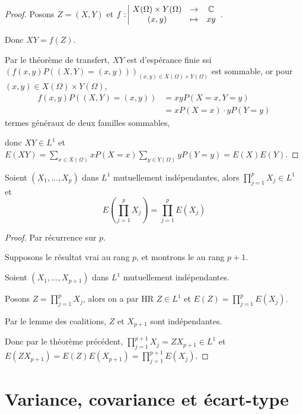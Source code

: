 \begin{proof}
    Posons $Z = (X, Y)$ et $f: \space \begin{array}{|ccc} \displaystyle X(\Omega) \times Y(\Omega) & \to & \displaystyle \mathbb{C} \\ \displaystyle (x, y) & \mapsto & \displaystyle xy \end{array}$.

    Donc $XY = f(Z)$.

    Par le théorème de transfert, $XY$ est d'espérance finie ssi $(f(x, y)P((X, Y) = (x, y)))_{(x, y) \in X(\Omega) \times Y(\Omega)}$ est sommable, 
    or pour $(x, y) \in X(\Omega) \times Y(\Omega)$, 
    \begin{align}
        f(x, y) P((X, Y) = (x, y)) & = x y P(X = x, Y = y) \\
        & = x P(X = x) \cdot y P(Y = y)
    \end{align}
    termes généraux de deux familles sommables, 
    
    donc $XY \in L^1$ et 
    $E(XY) = \displaystyle \sum_{x \in X(\Omega)} x P(X = x) \sum_{y \in Y(\Omega)} y P(Y = y) = E(X) E(Y)$.
\end{proof}

\begin{proposition}{}{}
    Soient $(X_1, \dots, X_p)$ dans $L^1$ mutuellement indépendantes, alors 
    $\displaystyle \prod_{j = 1}^p X_j \in L^1$ et 
    $$E\left( \prod_{j = 1}^{p } X_j \right) = \prod_{j = 1 }^{ p } E(X_j)$$
\end{proposition}


\begin{proof}
    Par récurrence sur $p$. 

    Supposons le résultat vrai au rang $p$, et montrons le au rang $p + 1$.

    Soient $(X_1, \dots, X_{p + 1})$ dans $L^1$ mutuellement indépendantes.

    Posons $\displaystyle Z = \prod_{j = 1 }^{ p } X_j$, alors on a par HR 
    $Z \in L^1$ et $E(Z) = \prod_{j = 1 }^{ p } E(X_j)$.

    Par le lemme des coalitions, $Z$ et $X_{p + 1}$ sont indépendantes.

    Donc par le théorème précédent, 
    $\displaystyle \prod_{j = 1 }^{p + 1} X_j = Z X_{p + 1} \in L^1$ et
    $E(Z X_{p + 1}) = E(Z) E(X_{p + 1}) = \prod_{j = 1}^{p + 1} E(X_j)$.
\end{proof}

\section{Variance, covariance et écart-type }

